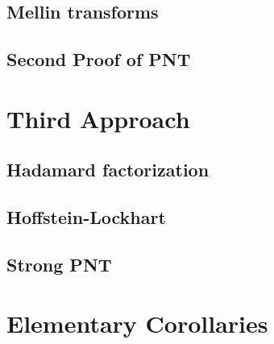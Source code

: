 \documentclass{report}
\theoremstyle{definition}
\begin{document}
\section{Mellin transforms}


\section{Second Proof of PNT}



\chapter{Third Approach}

\section{Hadamard factorization}


\section{Hoffstein-Lockhart}


\section{Strong PNT}


\chapter{Elementary Corollaries}


\end{document}
